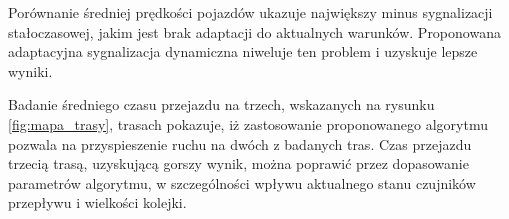 Porównanie średniej prędkości pojazdów ukazuje największy minus sygnalizacji stałoczasowej, jakim jest brak adaptacji do aktualnych warunków. Proponowana adaptacyjna sygnalizacja dynamiczna niweluje ten problem i uzyskuje lepsze wyniki.

Badanie średniego czasu przejazdu na trzech, wskazanych na rysunku \ref{fig:mapa_trasy}, trasach pokazuje, iż zastosowanie proponowanego algorytmu pozwala na przyspieszenie ruchu na dwóch z badanych tras. Czas przejazdu trzecią trasą, uzyskującą gorszy wynik, można poprawić przez dopasowanie parametrów algorytmu, w szczególności wpływu aktualnego stanu czujników przepływu i wielkości kolejki.